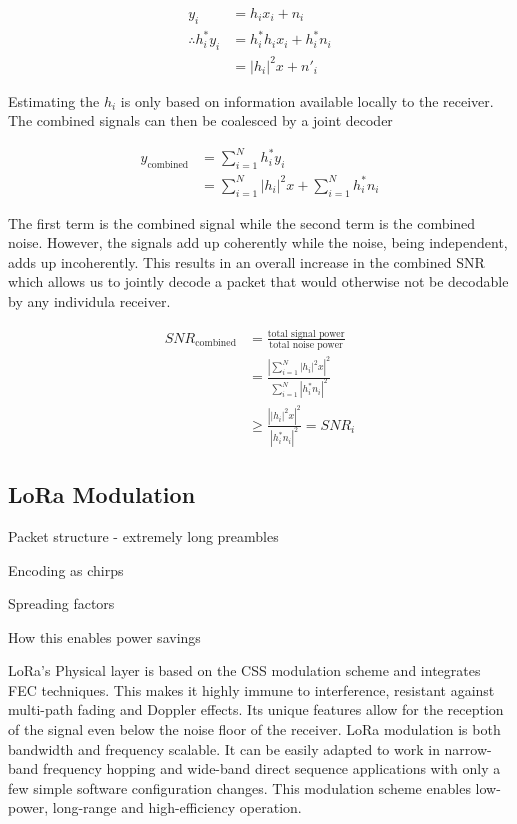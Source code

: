 \begin{align*}
y_i &= h_i x_i + n_i \\
\therefore h^*_i y_i &= h^*_i h_i x_i + h^*_i n_i \\
	&= \left| h_i \right|^2 x + n'_i
\end{align*}

Estimating the $h_i$ is only based on information available locally to the receiver.
The combined signals can then be coalesced by a joint decoder

\begin{align*}
y_{\text{combined}}
	&= \sum_{i=1}^N h^*_i y_i \\
	&= \sum_{i=1}^N \left| h_i \right|^2 x + \sum_{i=1}^N h^*_i n_i
\end{align*}

The first term is the combined signal while the second term is the combined
noise. However, the signals add up coherently while the noise, being
independent, adds up incoherently. This results in an overall increase in the
combined SNR which allows us to jointly decode a packet that would otherwise
not be decodable by any individula receiver.

\begin{align*}
SNR_{\text{combined}} &= \frac{\text{total signal power}}{\text{total noise power}} \\
	&= \frac{\left| \sum_{i=1}^N \left| h_i \right|^2 x \right|^2}{\sum_{i=1}^N \left| h^*_i n_i \right|^2} \\
	&\geq \frac{\left| \left| h_i \right|^2 x \right|^2}{\left| h^*_i n_i \right|^2} = SNR_i
\end{align*}

\subsection{LoRa Modulation}
\label{sec:lora}

{\color{blue}
Packet structure - extremely long preambles

Encoding as chirps

Spreading factors

How this enables power savings
}

\ac{LoRa}'s Physical layer is based on the \ac{CSS} modulation scheme and integrates \ac{FEC} techniques.
This makes it highly immune to interference, resistant against multi-path fading and Doppler effects.
Its unique features allow for the reception of the signal even below the noise floor of the receiver.
\ac{LoRa} modulation is both bandwidth and frequency scalable.
It can be easily adapted to work in narrow-band frequency hopping and wide-band direct sequence applications with only a few simple software configuration changes.
This modulation scheme enables low-power, long-range and high-efficiency operation.

